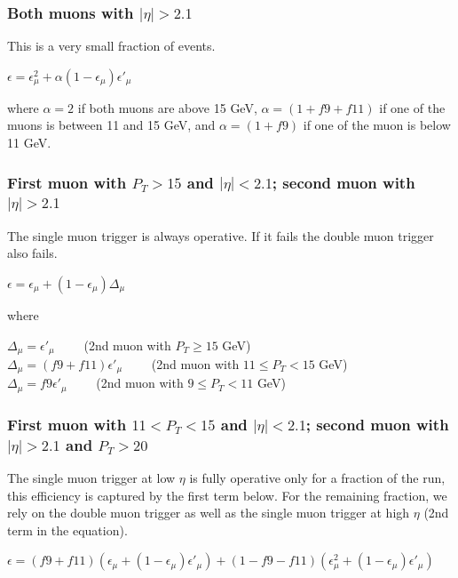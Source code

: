 \subsubsection{Both muons with $|\eta|>2.1$}
This is a very small fraction of events.  

\begin{center}
$\epsilon = \epsilon_{\mu}^2 + \alpha (1-\epsilon_{\mu}) \epsilon'_{\mu}$
\end{center}

\noindent where $\alpha=2$ if both muons are above 15 GeV, $\alpha=(1+f9+f11)$ if
one of the muons is between 11 and 15 GeV, and $\alpha=(1+f9)$ if one of the muon
is below 11 GeV.

\subsubsection{First muon with $P_T>15$ and $|\eta|<2.1$;  second muon 
with $|\eta|>2.1$}
The single muon trigger is always operative.  If it fails the double muon 
trigger also fails.

\begin{center}
$\epsilon = \epsilon_{\mu} + (1-\epsilon_{\mu})\Delta_{\mu}$
\end{center}

\noindent where

\begin{center}
$\Delta_{\mu} = \epsilon'_{\mu}$ ~~~~(2nd muon with $P_T \geq 15$ GeV) \\
$\Delta_{\mu} = (f9+f11)\epsilon'_{\mu}$ ~~~~(2nd muon with $11 \leq P_T < 15$ GeV) \\
$\Delta_{\mu} = f9\epsilon'_{\mu}$ ~~~~(2nd muon with $9 \leq P_T < 11$ GeV) \\
\end{center}


\subsubsection{First muon with $11<P_T<15$ and $|\eta|<2.1$;  second muon 
with $|\eta|>2.1$ and $P_T>20$}
The single muon trigger at low $\eta$ is fully operative only for a fraction of the run,
this efficiency is captured by the first term below.
For the remaining fraction, we rely on the double muon trigger as well as the 
single muon trigger at high $\eta$ (2nd term in the equation).

\begin{center}
$\epsilon = (f9+f11)(\epsilon_{\mu} + (1-\epsilon_{\mu})\epsilon'_{\mu})
 + (1-f9-f11)(\epsilon_{\mu}^2 + (1-\epsilon_{\mu})\epsilon'_{\mu})$ 
\end{center}

